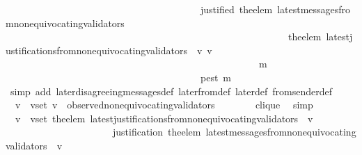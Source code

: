 \begin{isabellebody}
\ \ \ \ \ \ \ \ \ \ \ \ \ \ \ \ \ \ \ \ \ \ \ \ \ \ \ \ \ \ \ \ \ \ \ \ \ \ \ {\isasymand}\ justified\ {\isacharparenleft}the{\isacharunderscore}elem\ {\isacharparenleft}latest{\isacharunderscore}messages{\isacharunderscore}from{\isacharunderscore}non{\isacharunderscore}equivocating{\isacharunderscore}validators\ \isanewline
\ \ \ \ \ \ \ \ \ \ \ \ \ \ \ \ \ \ \ \ \ \ \ \ \ \ \ \ \ \ \ \ \ \ \ \ \ \ \ \ \ \ \ \ \ \ \ \ \ \ \ \ \ \ \ \ \ \ {\isacharparenleft}the{\isacharunderscore}elem\ {\isacharparenleft}latest{\isacharunderscore}justifications{\isacharunderscore}from{\isacharunderscore}non{\isacharunderscore}equivocating{\isacharunderscore}validators\ {\isasymsigma}\ v{\isacharparenright}{\isacharparenright}\ v{\isacharparenright}{\isacharparenright}\isanewline
\ \ \ \ \ \ \ \ \ \ \ \ \ \ \ \ \ \ \ \ \ \ \ \ \ \ \ \ \ \ \ \ \ \ \ \ \ \ \ \ \ \ \ \ \ \ \ \ \ \ \ \ m{\isacharprime}{\isacharbraceright}{\isachardot}\isanewline
\ \ \ \ \ \ \ \ \ \ \ \ \ \ \ \ \ \ \ \ \ \ \ \ \ \ \ \ \ \ \ \ \ \ \ \ \ \ \ \ p{\isacharparenleft}est\ m{\isacharparenright}{\isacharparenright}{\isachardoublequoteclose}\isanewline
\ \ \ \ \isamarkupfalse%
\ {\isacharparenleft}simp\ add{\isacharcolon}\ later{\isacharunderscore}disagreeing{\isacharunderscore}messages{\isacharunderscore}def\ later{\isacharunderscore}from{\isacharunderscore}def\ later{\isacharunderscore}def\ from{\isacharunderscore}sender{\isacharunderscore}def{\isacharparenright}\isanewline
\ \ \isamarkupfalse%
\ {\isachardoublequoteopen}{\isasymforall}\ v\ {\isasymin}\ v{\isacharunderscore}set{\isachardot}\ v\ {\isasymin}\ observed{\isacharunderscore}non{\isacharunderscore}equivocating{\isacharunderscore}validators\ {\isasymsigma}{\isachardoublequoteclose}\ \isanewline
\ \ \ \ \isamarkupfalse%
\ clique\ \isamarkupfalse%
\ simp\isanewline
\ \ \isamarkupfalse%
\ \isamarkupfalse%
\ {\isachardoublequoteopen}{\isasymforall}\ v\ {\isasymin}\ v{\isacharunderscore}set{\isachardot}\ the{\isacharunderscore}elem\ {\isacharparenleft}latest{\isacharunderscore}justifications{\isacharunderscore}from{\isacharunderscore}non{\isacharunderscore}equivocating{\isacharunderscore}validators\ {\isasymsigma}\ v{\isacharparenright}\isanewline
\ \ \ \ \ \ \ \ \ \ \ \ \ \ \ \ \ \ \ \ {\isacharequal}\ \ justification\ {\isacharparenleft}the{\isacharunderscore}elem\ {\isacharparenleft}latest{\isacharunderscore}messages{\isacharunderscore}from{\isacharunderscore}non{\isacharunderscore}equivocating{\isacharunderscore}validators\ {\isasymsigma}\ v{\isacharparenright}{\isacharparenright}{\isachardoublequoteclose}\isanewline

\end{isabellebody}
